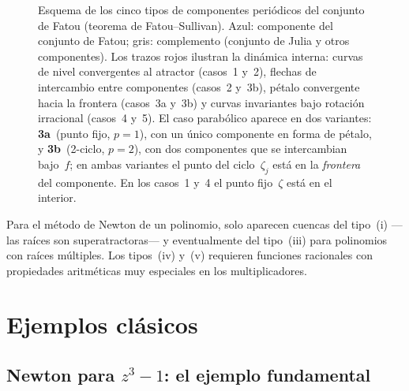 \documentclass[11pt,a4paper]{article}
\theoremstyle{plain}
\theoremstyle{definition}
\theoremstyle{remark}
\begin{document}
\begin{figure}[htbp]
\caption{Esquema de los cinco tipos de componentes peri\'odicos del conjunto de Fatou
(teorema de Fatou--Sullivan).
Azul: componente del conjunto de Fatou; gris: complemento
(conjunto de Julia y otros componentes).
Los trazos rojos ilustran la din\'amica interna:
curvas de nivel convergentes al atractor (casos~1 y~2),
flechas de intercambio entre componentes (casos~2 y~3b),
p\'etalo convergente hacia la frontera (casos~3a y~3b) y
curvas invariantes bajo rotaci\'on irracional (casos~4 y~5).
El caso parab\'olico aparece en dos variantes:
\textbf{3a}~(punto fijo, $p=1$), con un \'unico componente en forma de p\'etalo, y
\textbf{3b}~(2-ciclo, $p=2$), con dos componentes que se intercambian bajo~$f$;
en ambas variantes el punto del ciclo~$\zeta_j$ est\'a en la
\emph{frontera} del componente.
En los casos~1 y~4 el punto fijo~$\zeta$ est\'a en el interior.}
\label{fig:fatou-tipos}
\end{figure}


Para el método de Newton de un polinomio, solo aparecen cuencas del
tipo~(i) —las raíces son superatractoras— y eventualmente del tipo~(iii)
para polinomios con raíces múltiples.
Los tipos~(iv) y~(v) requieren funciones racionales con propiedades
aritméticas muy especiales en los multiplicadores.

\section{Ejemplos clásicos}
\label{sec:ejemplos}

\subsection{Newton para \texorpdfstring{$z^3-1$}{z3-1}: el ejemplo fundamental}
\end{document}
